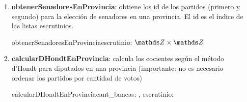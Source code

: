 \documentclass[10pt,a4paper]{article}
\begin{document}
\begin{enumerate}
    \item \textbf{obtenerSenadoresEnProvincia}: obtiene los id de los partidos (primero y segundo) para la elección de senadores en una provincia. El id es el índice de las listas escrutinios.
    \begin{proc}{obtenerSenadoresEnProvincia}{\In escrutinio: \TLista{\ent}}{$\ent \times \ent$}
 


   
\end{proc}





    \item \textbf{calcularDHondtEnProvincia}: calcula los cocientes según el método d’Hondt para diputados en una provincia (importante: no es necesario ordenar los partidos por cantidad de votos)
    \begin{proc}{calcularDHondtEnProvincia}{\In cant\_bancas: \ent, \In escrutinio: \TLista{\ent}}{\TLista{\TLista{\ent}}}
\end{proc}



\end{enumerate}
\end{document}
